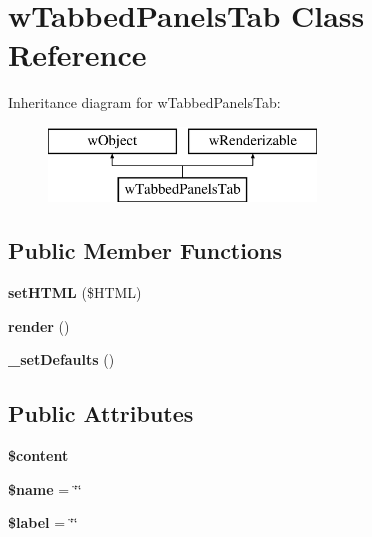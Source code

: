 \hypertarget{classwTabbedPanelsTab}{
\section{wTabbedPanelsTab Class Reference}
\label{classwTabbedPanelsTab}
}
Inheritance diagram for wTabbedPanelsTab:\begin{figure}[H]
\begin{center}
\leavevmode
\includegraphics[height=2.000000cm]{classwTabbedPanelsTab}
\end{center}
\end{figure}
\subsection*{Public Member Functions}
\begin{DoxyCompactItemize}
\item 
\hypertarget{classwTabbedPanelsTab_a7e95589bca465bedb929ddfa5aba4772}{
{\bfseries setHTML} (\$HTML)}
\label{classwTabbedPanelsTab_a7e95589bca465bedb929ddfa5aba4772}

\item 
\hypertarget{classwTabbedPanelsTab_ab7a26547f4986c40b88db043d943ec66}{
{\bfseries render} ()}
\label{classwTabbedPanelsTab_ab7a26547f4986c40b88db043d943ec66}

\item 
\hypertarget{classwTabbedPanelsTab_a79db8f792fab6f0c69a765ede0877faa}{
{\bfseries \_\-setDefaults} ()}
\label{classwTabbedPanelsTab_a79db8f792fab6f0c69a765ede0877faa}

\end{DoxyCompactItemize}
\subsection*{Public Attributes}
\begin{DoxyCompactItemize}
\item 
\hypertarget{classwTabbedPanelsTab_a79ea3eb43c3c3d023e0031455c497ed6}{
{\bfseries \$content}}
\label{classwTabbedPanelsTab_a79ea3eb43c3c3d023e0031455c497ed6}

\item 
\hypertarget{classwTabbedPanelsTab_afdcbdfc74164d6c6eeccb705c1287a28}{
{\bfseries \$name} = \char`\"{}\char`\"{}}
\label{classwTabbedPanelsTab_afdcbdfc74164d6c6eeccb705c1287a28}

\item 
\hypertarget{classwTabbedPanelsTab_a8e7f16b7d7acc993ba1d1d2dd738e43d}{
{\bfseries \$label} = \char`\"{}\char`\"{}}
\label{classwTabbedPanelsTab_a8e7f16b7d7acc993ba1d1d2dd738e43d}

\end{DoxyCompactItemize}


